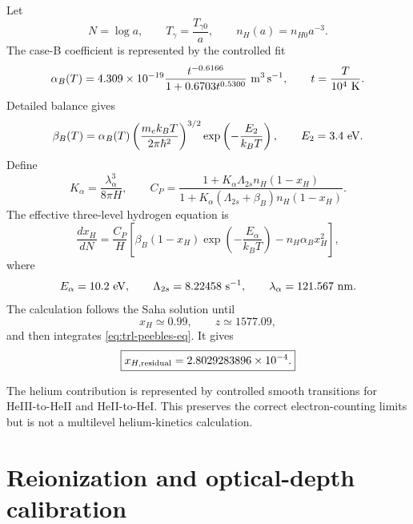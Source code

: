Let
\begin{equation}
N=\log a,
\qquad
T_\gamma=\frac{T_{\gamma0}}{a},
\qquad
n_H(a)=n_{H0}a^{-3}.
\label{eq:trl-recomb-definitions}
\end{equation}
The case-B coefficient is represented by the controlled fit
\begin{equation}
\alpha_B(T)
=
4.309\times10^{-19}
\frac{t^{-0.6166}}{1+0.6703t^{0.5300}}
\ {\rm m^3\,s^{-1}},
\qquad
t=\frac{T}{10^4\ {\rm K}}.
\label{eq:trl-alphaB}
\end{equation}
Detailed balance gives
\begin{equation}
\beta_B(T)
=
\alpha_B(T)
\left(\frac{m_ek_BT}{2\pi\hbar^2}\right)^{3/2}
\exp\left(-\frac{E_2}{k_BT}\right),
\qquad
E_2=3.4\ {\rm eV}.
\label{eq:trl-betaB}
\end{equation}
Define
\begin{equation}
K_\alpha
=
\frac{\lambda_\alpha^3}{8\pi H},
\qquad
C_P
=
\frac{1+K_\alpha\Lambda_{2s}n_H(1-x_H)}
{1+K_\alpha(\Lambda_{2s}+\beta_B)n_H(1-x_H)}.
\label{eq:trl-peebles-C}
\end{equation}
The effective three-level hydrogen equation is
\begin{equation}
\boxed{
\frac{dx_H}{dN}
=
\frac{C_P}{H}
\left[
\beta_B(1-x_H)
\exp\left(-\frac{E_\alpha}{k_BT}\right)
-n_H\alpha_Bx_H^2
\right],
}
\label{eq:trl-peebles-eq}
\end{equation}
where
\begin{equation}
E_\alpha=10.2\ {\rm eV},
\qquad
\Lambda_{2s}=8.22458\ {\rm s}^{-1},
\qquad
\lambda_\alpha=121.567\ {\rm nm}.
\label{eq:trl-atomic-constants}
\end{equation}
The calculation follows the Saha solution until
\begin{equation}
x_H\simeq0.99,
\qquad
z\simeq1577.09,
\label{eq:trl-switch}
\end{equation}
and then integrates \eqref{eq:trl-peebles-eq}.  It gives
\begin{equation}
\boxed{x_{H,{\rm residual}}=2.8029283896\times10^{-4}.}
\label{eq:trl-residual-xe}
\end{equation}

The helium contribution is represented by controlled smooth transitions for HeIII-to-HeII and HeII-to-HeI.  This preserves the correct electron-counting limits but is not a multilevel helium-kinetics calculation.

\section{Reionization and optical-depth calibration}

